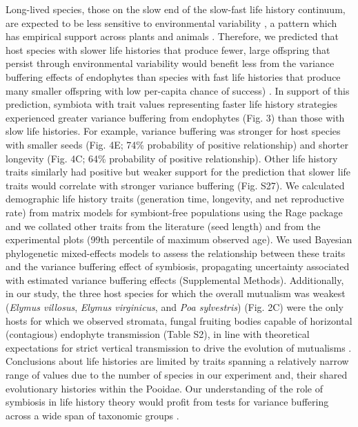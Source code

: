 \documentclass[12pt]{article}
\begin{document}
Long-lived species, those on the slow end of the slow-fast life history continuum, are expected to be less sensitive to environmental variability \cite{murphy1968pattern}, a pattern which has empirical support across plants \cite{compagnoni2021herbaceous} and animals \cite{le2022life,morris2008longevity}.
Therefore, we predicted that host species with slower life histories that produce fewer, large offspring that persist through environmental variability would benefit less from the variance buffering effects of endophytes than species with fast life histories that produce many smaller offspring with low per-capita chance of success) \cite{rees1996evolutionary,moles2004seedling}.
In support of this prediction,  symbiota with trait values representing faster life history strategies experienced greater variance buffering from endophytes (Fig. 3) than those with slow life histories. 
For example, variance buffering was stronger for host species with smaller seeds (Fig. 4E; 74\% probability of positive relationship) and shorter longevity (Fig. 4C; 64\% probability of positive relationship).
Other life history traits similarly had positive but weaker support for the prediction that slower life traits would correlate with stronger variance buffering (Fig. S27).
We calculated demographic life history traits (generation time, longevity, and net reproductive rate) from matrix models for symbiont-free populations using the Rage package \cite{jones2022rcompadre} and we collated other traits from the literature (seed length) and from the experimental plots (99th percentile of maximum observed age). 
We used Bayesian phylogenetic mixed-effects models to assess the relationship between these traits and the variance buffering effect of symbiosis, propagating uncertainty associated with estimated variance buffering effects (Supplemental Methods).
Additionally, in our study, the three host species for which the overall mutualism was weakest (\emph{Elymus villosus}, \emph{Elymus virginicus}, and \emph{Poa sylvestris}) (Fig. 2C) were the only hosts for which we observed stromata, fungal fruiting bodies capable of horizontal (contagious) endophyte transmission (Table S2), in line with theoretical expectations for strict vertical transmission to drive the evolution of mutualisms \cite{fine1975vectors,afkhami2008symbiosis}.
Conclusions about life histories are limited by traits spanning a relatively narrow range of values due to the number of species in our experiment and, their shared evolutionary histories within the Pooidae. 
Our understanding of the role of symbiosis in life history theory would profit from tests for variance buffering across a wide span of taxonomic groups \cite{jeschke2009roles}.
\end{document}
